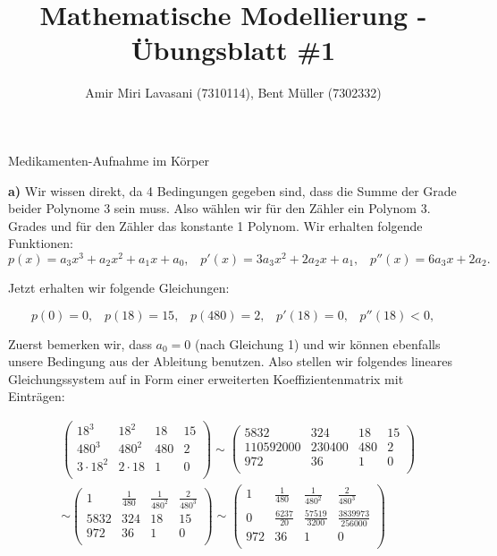 \documentclass[a4paper]{article}
\newenvironment{Aufgabe}[2][Aufgabe]{\begin{trivlist}
\item[\hskip \labelsep {\bfseries #1}\hskip \labelsep {\bfseries #2.}]}{\end{trivlist}}
\begin{document}
 
\title{ \textbf{Mathematische Modellierung - Übungsblatt \#1} }

\author{Amir Miri Lavasani (7310114), Bent Müller (7302332)} \maketitle

\begin{Aufgabe}{1}
Medikamenten-Aufnahme im Körper
\end{Aufgabe}

\textbf{a)} Wir wissen direkt, da 4 Bedingungen gegeben sind, dass die Summe der Grade beider Polynome 3 
sein muss. Also wählen wir für den Zähler ein Polynom 3. Grades und für den
Zähler das konstante 1 Polynom. Wir erhalten folgende Funktionen:
\[
	p(x) = a_3 x^{3} + a_2 x ^{2} + a_1 x + a_0 ,\;\;\; 
	p'(x) = 3 a_3 x ^{2} + 2 a_2 x + a_1 ,\;\;\; 
	p''(x) = 6 a_3 x + 2 a_2
.\] 

Jetzt erhalten wir folgende Gleichungen:

\[
	p(0) = 0,\;\;\; 
	p(18) = 15,\;\;\; 
	p(480) = 2,\;\;\; 
	p'(18) = 0,\;\;\; 
	p''(18) < 0,
\] 

Zuerst bemerken wir, dass $a_0 = 0$ (nach Gleichung 1) und wir
können ebenfalls unsere Bedingung aus der Ableitung benutzen. Also
stellen wir folgendes lineares Gleichungssystem auf in Form einer erweiterten Koeffizientenmatrix
mit Einträgen:

\begin{align*}
	& \left(\begin{array}{ccc|c}  
		18 ^3 & 18 ^2 & 18 & 15\\
		480 ^3 & 480 ^2 & 480 & 2\\
		3 \cdot 18 ^2 & 2 \cdot 18 & 1 & 0\\
	\end{array}\right)
	\sim 
	\left(\begin{array}{ccc|c}  
		5832 & 324 & 18 & 15\\
		110592000 & 230400 & 480 & 2\\
		972 & 36 & 1 & 0\\
	\end{array}\right) \\
	&\sim 
	\left(\begin{array}{ccc|c}  
		1 & \frac{ 1 }{ 480 } & \frac{ 1 }{ 480 ^2 } & \frac{ 2 }{ 480 ^3 }\\
		5832 & 324 & 18 & 15\\
		972 & 36 & 1 & 0\\
	\end{array}\right)
	\sim 
	\left(\begin{array}{ccc|c}  
		1 & \frac{ 1 }{ 480 } & \frac{ 1 }{ 480 ^2 } & \frac{ 2 }{ 480 ^3 }\\
		0 & \frac{ 6237 }{ 20 } & \frac{ 57519 }{ 3200 } & \frac{ 3839973 }{ 256000 } \\
		972 & 36 & 1 & 0\\
	\end{array}\right)
\end{align*}
\end{document}
